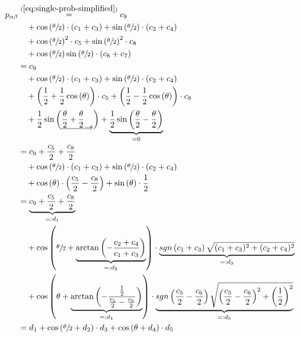 \begin{equation}
    \label{eq:single-prob-simplified-simplified}
    \begin{split}
        p_{\alpha\beta}
            &\stackrel{(\ref{eq:single-prob-simplified})}= c_9 \\
                &\quad + \cos\left(\sfrac\theta2\right) \cdot \left(c_1 + c_3\right) + \sin\left(\sfrac\theta2\right) \cdot \left(c_2 + c_4\right) \\
                &\quad + \cos\left(\sfrac\theta2\right)^2 \cdot c_5 + \sin\left(\sfrac\theta2\right)^2 \cdot c_8 \\
                &\quad + \cos\left(\sfrac\theta2\right)\sin\left(\sfrac\theta2\right) \cdot \left(c_6 + c_7\right) \\
            &= c_9 \\
                &\quad + \cos\left(\sfrac\theta2\right) \cdot \left(c_1 + c_3\right) + \sin\left(\sfrac\theta2\right) \cdot \left(c_2 + c_4\right) \\
                &\quad + \left(\frac12 + \frac12 \cos\left(\theta\right)\right) \cdot c_5 + \left(\frac12 - \frac12 \cos\left(\theta\right)\right) \cdot c_8 \\
                &\quad + \frac12 \sin\left(\underline{\frac\theta2 + \frac\theta2}_{=\theta}\right) + \underbrace{\frac12 \sin\left(\frac\theta2 - \frac\theta2\right)}_{= 0} \\
            &= c_9 + \frac{c_5}{2} + \frac{c_8}{2} \\
                &\quad + \cos\left(\sfrac\theta2\right) \cdot \left(c_1 + c_3\right) + \sin\left(\sfrac\theta2\right) \cdot \left(c_2 + c_4\right) \\
                &\quad + \cos\left(\theta\right) \cdot \left(\frac{c_5}{2} - \frac{c_8}{2}\right) + \sin\left(\theta\right) \cdot \frac12 \\
            &= \underbrace{c_9 + \frac{c_5}{2} + \frac{c_8}{2}}_{=: d_1} \\
                &\quad + \cos\left(\sfrac\theta2 + \underbrace{\arctan\left(-\frac{c_2 + c_4}{c_1 + c_3}\right)}_{=: d_2}\right) \cdot \underbrace{sgn\left(c_1 + c_3\right) \sqrt{(c_1 + c_3)^2 + (c_2 + c_4)^2}}_{=: d_3} \\
                &\quad + \cos\left(\theta + \underbrace{\arctan\left(-\frac{\frac12}{\frac{c_5}{2} - \frac{c_6}{2}}\right)}_{=: d_4}\right) \cdot \underbrace{sgn\left(\frac{c_5}{2} - \frac{c_6}{2}\right) \sqrt{\left(\frac{c_5}{2} - \frac{c_6}{2}\right)^2 + \left(\frac12\right)^2}}_{=: d_5} \\
            &= d_1 + \cos\left(\sfrac\theta2 + d_2\right) \cdot d_3 + \cos\left(\theta + d_4\right) \cdot d_5
    \end{split}
\end{equation}

